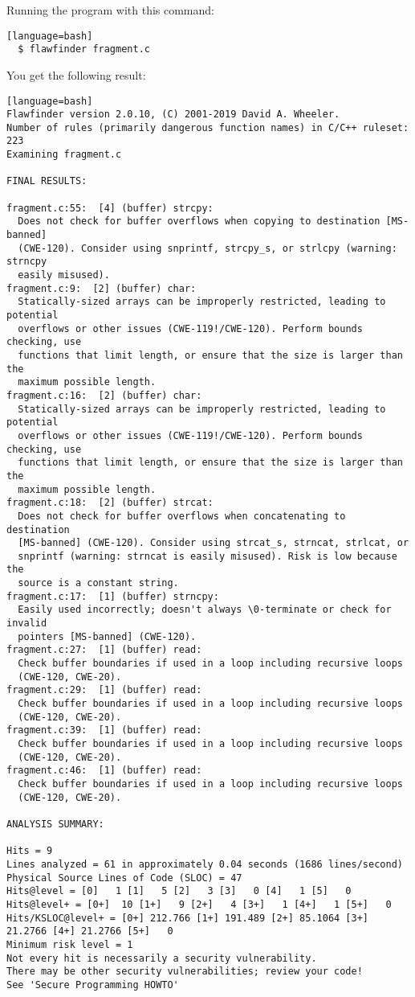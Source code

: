 \documentclass[a4paper,12pt]{article}
\begin{document}
Running the program with this command:\begin{lstlisting}[style=DOS][language=bash]
  $ flawfinder fragment.c
\end{lstlisting}
You get the following result:
\begin{lstlisting}[style=DOS][language=bash]
Flawfinder version 2.0.10, (C) 2001-2019 David A. Wheeler.
Number of rules (primarily dangerous function names) in C/C++ ruleset: 223
Examining fragment.c

FINAL RESULTS:

fragment.c:55:  [4] (buffer) strcpy:
  Does not check for buffer overflows when copying to destination [MS-banned]
  (CWE-120). Consider using snprintf, strcpy_s, or strlcpy (warning: strncpy
  easily misused).
fragment.c:9:  [2] (buffer) char:
  Statically-sized arrays can be improperly restricted, leading to potential
  overflows or other issues (CWE-119!/CWE-120). Perform bounds checking, use
  functions that limit length, or ensure that the size is larger than the
  maximum possible length.
fragment.c:16:  [2] (buffer) char:
  Statically-sized arrays can be improperly restricted, leading to potential
  overflows or other issues (CWE-119!/CWE-120). Perform bounds checking, use
  functions that limit length, or ensure that the size is larger than the
  maximum possible length.
fragment.c:18:  [2] (buffer) strcat:
  Does not check for buffer overflows when concatenating to destination
  [MS-banned] (CWE-120). Consider using strcat_s, strncat, strlcat, or
  snprintf (warning: strncat is easily misused). Risk is low because the
  source is a constant string.
fragment.c:17:  [1] (buffer) strncpy:
  Easily used incorrectly; doesn't always \0-terminate or check for invalid
  pointers [MS-banned] (CWE-120).
fragment.c:27:  [1] (buffer) read:
  Check buffer boundaries if used in a loop including recursive loops
  (CWE-120, CWE-20).
fragment.c:29:  [1] (buffer) read:
  Check buffer boundaries if used in a loop including recursive loops
  (CWE-120, CWE-20).
fragment.c:39:  [1] (buffer) read:
  Check buffer boundaries if used in a loop including recursive loops
  (CWE-120, CWE-20).
fragment.c:46:  [1] (buffer) read:
  Check buffer boundaries if used in a loop including recursive loops
  (CWE-120, CWE-20).

ANALYSIS SUMMARY:

Hits = 9
Lines analyzed = 61 in approximately 0.04 seconds (1686 lines/second)
Physical Source Lines of Code (SLOC) = 47
Hits@level = [0]   1 [1]   5 [2]   3 [3]   0 [4]   1 [5]   0
Hits@level+ = [0+]  10 [1+]   9 [2+]   4 [3+]   1 [4+]   1 [5+]   0
Hits/KSLOC@level+ = [0+] 212.766 [1+] 191.489 [2+] 85.1064 [3+] 21.2766 [4+] 21.2766 [5+]   0
Minimum risk level = 1
Not every hit is necessarily a security vulnerability.
There may be other security vulnerabilities; review your code!
See 'Secure Programming HOWTO'

\end{lstlisting}
\end{document}
